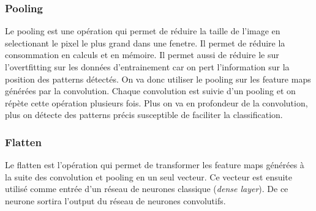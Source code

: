 \subsubsection*{Pooling}
Le pooling est une opération qui permet de réduire la taille de l'image en
selectionant le pixel le plus grand dans une fenetre. Il permet de réduire la
consommation en calculs et en mémoire. Il permet aussi de réduire le sur
l'overtfitting sur les données d'entrainement car on pert l'information sur la
position des patterns détectés. On va donc utiliser le pooling sur les feature
maps générées par la convolution. Chaque convolution est suivie d'un pooling
et on répète cette opération plusieurs fois. Plus on va en profondeur de la
convolution, plus on détecte des patterns précis susceptible de faciliter la classification.\\

\subsubsection*{Flatten}
Le flatten est l'opération qui permet de transformer les feature maps générées à
la suite des convolution et pooling en un seul vecteur. Ce vecteur est ensuite
utilisé comme entrée d'un réseau de neurones classique (\emph{dense layer}). De ce
neurone sortira l'output du réseau de neurones convolutifs.

